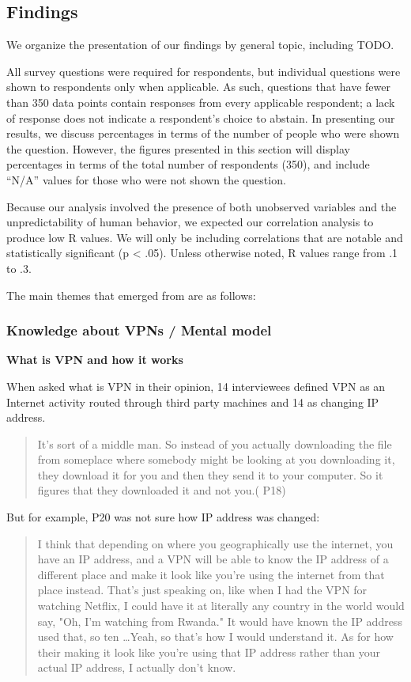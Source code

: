 \subsection{Findings}\label{Findings}

We organize the presentation of our findings by general topic, including TODO.

All survey questions were required for respondents, but individual questions were shown to respondents only when applicable. As such, questions that have fewer than 350 data points contain responses from every applicable respondent; a lack of response does not indicate a respondent’s choice to abstain. In presenting our results, we discuss percentages in terms of the number of people who were shown the question. However, the figures presented in this section will display percentages in terms of the total number of respondents (350), and include “N/A” values for those who were not shown the question.

Because our analysis involved the presence of both unobserved variables and the unpredictability of human behavior, we expected our correlation analysis to produce low R values. We will only be including correlations that are notable and statistically significant (p < .05). Unless otherwise noted, R values range from .1 to .3.


The main themes that emerged from are as follows: 

\subsubsection{Knowledge about VPNs / Mental model}

\textbf{What is VPN and how it works}

When asked what is VPN in their opinion, 14 interviewees defined VPN as an Internet activity routed through third party machines and 14 as changing IP address. 
\begin{quote}It's sort of a middle man. So instead of you actually downloading the file from someplace where somebody might be looking at you downloading it, they download it for you and then they send it to your computer. So it figures that they downloaded it and not you.( P18)\end{quote}


But for example, P20 was not sure how IP address was changed:
\begin{quote}I think that depending on where you geographically use the internet, you have an IP address, and a VPN will be able to know the IP address of a different place and make it look like you're using the internet from that place instead. That's just speaking on, like when I had the VPN for watching Netflix, I could have it at literally any country in the world would say, "Oh, I'm watching from Rwanda." It would have known the IP address used that, so ten \dots Yeah, so that's how I would understand it.
As for how their making it look like you're using that IP address rather than your actual IP address, I actually don't know.\end{quote}


